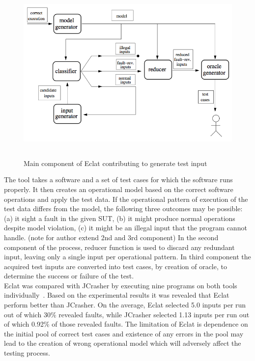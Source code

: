 \begin{figure}[h]
	\centering
	\includegraphics[width=15cm, height=9cm]{chapter2/eclat_working.png}
	\caption{Main component of Eclat contributing to generate test input~\cite{Pacheco2005}}
	\label{fig:eclat}
\end{figure}


\noindent The tool takes a software and a set of test cases for which the software runs properly. It then creates an operational model based on the correct software operations and apply the test data. If the operational pattern of execution of the test data differs from the model, the following three outcomes may be possible: (a) it sight a fault in the given SUT, (b) it might produce normal operations despite model violation, (c) it might be an illegal input that the program cannot handle. (note for author extend 2nd and 3rd component)
In the second component of the process, reducer function is used to discard any redundant input, leaving only a single input per operational pattern. In third component the acquired test inputs are converted into test cases, by creation of oracle, to determine the success or failure of the test. \\
\indent Eclat was compared with JCrasher by executing nine programs on  both tools individually~\cite{Pacheco2007b}. Based on the experimental results it was revealed that Eclat perform better than JCrasher. On the average, Eclat selected 5.0 inputs per run out of which 30\% revealed faults, while JCrasher selected 1.13 inputs per run out of which 0.92\% of those revealed faults. The limitation of Eclat is dependence on the initial pool of correct test cases and existence of any errors in the pool may lead to the creation of wrong operational model which will adversely affect the testing process.   

